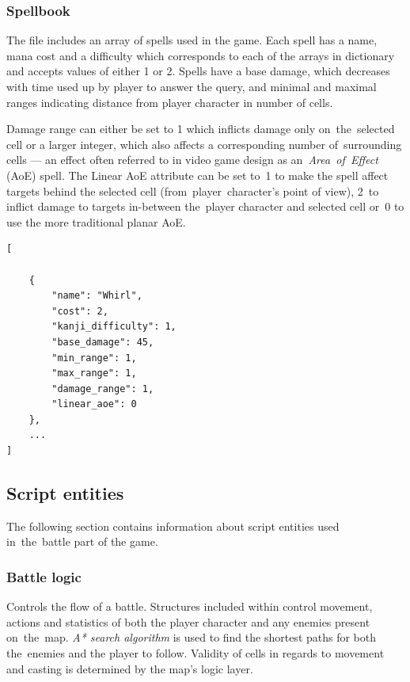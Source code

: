 \documentclass[thesis=B,english,hidelinks]{FITthesisXE}[2012/06/26]
\begin{document}
\subsubsection{Spellbook}

The file includes an array of spells used in the game. Each spell has a name, mana cost and a difficulty which corresponds to each of the arrays in dictionary and accepts values of either 1 or 2. Spells have a base damage, which decreases with time used up by player to answer the query, and minimal and maximal ranges indicating distance from player character in number of cells.

Damage range can either be set to 1 which inflicts damage only on~the~selected cell or a larger integer, which also affects a corresponding number of~surrounding cells --- an effect often referred to in video game design as an~\emph{Area~of~Effect} (AoE) spell. The Linear AoE attribute can be set to~1 to make the spell affect targets behind the selected cell (from~player~character's point of view), 2~to inflict damage to targets in-between the~player character and selected cell or~0 to use the more traditional planar AoE.

\begin{lstlisting}
[

    {
        "name": "Whirl",
        "cost": 2,
        "kanji_difficulty": 1,
        "base_damage": 45,
        "min_range": 1,
        "max_range": 1,
        "damage_range": 1,
        "linear_aoe": 0
    },
    ...
]
\end{lstlisting}

\newpage

\subsection{Script entities}

The following section contains information about script entities used in~the~battle part of the game.

\subsubsection{Battle logic}

Controls the flow of a battle. Structures included within control movement, actions and statistics of both the player character and any enemies present on~the~map. \emph{A* search algorithm}\autocite{astar} is used to find the shortest paths for both the~enemies and the player to follow. Validity of cells in regards to movement and casting is determined by the map's logic layer.
\end{document}
